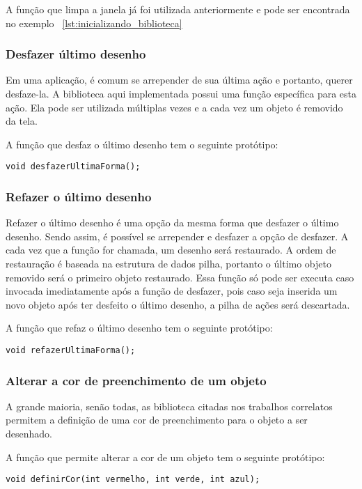 \documentclass[12pt, %
openright,
oneside, %
a4paper,    %
brazil]{facom-ufu-abntex2}
\begin{document}
A função que limpa a janela já foi utilizada anteriormente e pode ser encontrada no exemplo ~\ref{lst:inicializando_biblioteca}

\subsubsection{Desfazer último desenho}
Em uma aplicação, é comum se arrepender de sua última ação e portanto, querer desfaze-la. A biblioteca aqui implementada possui uma função específica para esta ação. Ela pode ser utilizada múltiplas vezes e a cada vez um objeto é removido da tela.

A função que desfaz o último desenho tem o seguinte protótipo:

\begin{verbatim}
void desfazerUltimaForma();
\end{verbatim}

\subsubsection{Refazer o último desenho}
Refazer o último desenho é uma opção da mesma forma que desfazer o último desenho. Sendo assim, é possível se arrepender e desfazer a opção de desfazer. A cada vez que a função for chamada, um desenho será restaurado. A ordem de restauração é baseada na estrutura de dados pilha, portanto o último objeto removido será o primeiro objeto restaurado. Essa função só pode ser executa caso invocada imediatamente após a função de desfazer, pois caso seja inserida um novo objeto após ter desfeito o último desenho, a pilha de ações será descartada.

A função que refaz o último desenho tem o seguinte protótipo:

\begin{verbatim}
void refazerUltimaForma();
\end{verbatim}

\subsubsection{Alterar a cor de preenchimento de um objeto} \label{api_definirCor}
A grande maioria, senão todas, as biblioteca citadas nos trabalhos correlatos permitem a definição de uma cor de preenchimento para o objeto a ser desenhado.

A função que permite alterar a cor de um objeto tem o seguinte protótipo:

\begin{verbatim}
void definirCor(int vermelho, int verde, int azul);
\end{verbatim}
\end{document}
